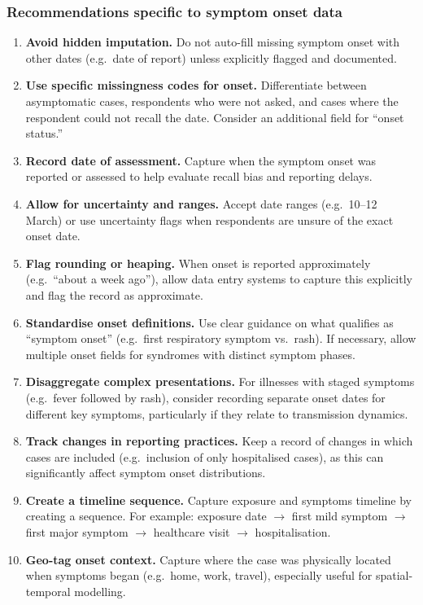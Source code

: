 \documentclass[11pt,a4paper]{article}
\begin{document}
\subsubsection{Recommendations specific to symptom onset data}

\begin{enumerate}
  \item \textbf{Avoid hidden imputation.}
    Do not auto-fill missing symptom onset with other dates (e.g.\ date of report) unless explicitly flagged and documented.

  \item \textbf{Use specific missingness codes for onset.}
    Differentiate between asymptomatic cases, respondents who were not asked, and cases where the respondent could not recall the date.
    Consider an additional field for ``onset status.''

  \item \textbf{Record date of assessment.}
    Capture when the symptom onset was reported or assessed to help evaluate recall bias and reporting delays.

  \item \textbf{Allow for uncertainty and ranges.}
    Accept date ranges (e.g.\ 10--12 March) or use uncertainty flags when respondents are unsure of the exact onset date.

  \item \textbf{Flag rounding or heaping.}
    When onset is reported approximately (e.g.\ ``about a week ago''), allow data entry systems to capture this explicitly and flag the record as approximate.

  \item \textbf{Standardise onset definitions.}
    Use clear guidance on what qualifies as ``symptom onset'' (e.g.\ first respiratory symptom vs.\ rash).
    If necessary, allow multiple onset fields for syndromes with distinct symptom phases.

  \item \textbf{Disaggregate complex presentations.}
    For illnesses with staged symptoms (e.g.\ fever followed by rash), consider recording separate onset dates for different key symptoms, particularly if they relate to transmission dynamics.

  \item \textbf{Track changes in reporting practices.}
    Keep a record of changes in which cases are included (e.g.\ inclusion of only hospitalised cases), as this can significantly affect symptom onset distributions.

  \item \textbf{Create a timeline sequence.}
    Capture exposure and symptoms timeline by creating a sequence.
    For example: exposure date $\to$ first mild symptom $\to$ first major symptom $\to$ healthcare visit $\to$ hospitalisation.

  \item \textbf{Geo-tag onset context.}
    Capture where the case was physically located when symptoms began (e.g.\ home, work, travel), especially useful for spatial-temporal modelling.
\end{enumerate}
\end{document}
